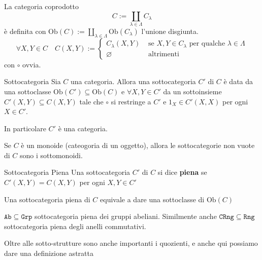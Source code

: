 \begin{example}
    La categoria coprodotto
    \[
      C := \coprod_{\lambda \in \Lambda} C_{\lambda} 
    \]
    è definita con \(\mathrm{Ob}{(C)} := \coprod_{\lambda \in \Lambda} \mathrm{Ob}{(C_{\lambda} )}\) l'unione disgiunta. 
    \[
      \forall X, Y \in C \quad C{(X, Y)} := \begin{cases}{}
          C_{\lambda} {(X, Y)} & \text{ se } X, Y \in C_{\lambda} \text{ per
          qualche } \lambda \in \Lambda \\
              \varnothing & \text{ altrimenti}
      \end{cases}
    \]
    con \(\circ\) ovvia.
\end{example}

\begin{definition}{Sottocategoria}
    Sia \(C\) una categoria. Allora una sottocategoria \(C'\) di \(C\) è data
    da una sottoclasse \(\mathrm{Ob}{(C')} \subseteq \mathrm{Ob}{(C)} \) e \(\forall X, Y \in C'\) da un sottoinsieme \(C'{(X, Y)} \subseteq C{(X, Y)} \) tale che \(\circ\) si restringe a \(C'\) e \(1_X \in C'{(X, X)}\) per ogni \(X \in C'\).

    In particolare \(C'\) è una categoria.
\end{definition}

\begin{example}{}
    Se \(C\) è un monoide (cateogoria di un oggetto), allora le sottocategorie
    non vuote di \(C\) sono i sottomonoidi.
\end{example}

\begin{definition}{Sottocategoria Piena}
    Una sottocategoria \(C'\) di \(C\) si dice \textbf{piena} se \(C'{(X, Y)} =
    C{(X, Y)}\) per ogni \(X, Y \in C'\) 
\end{definition}

\begin{remark}{}
    Una sottocategoria piena di \(C\) equivale a dare una sottoclasse di \(\mathrm{Ob}{(C)}\) 
\end{remark}

\begin{example}
    \(\mathtt{Ab} \subseteq \mathtt{Grp} \) sottocategoria piena dei gruppi
    abeliani. Similmente anche \(\mathtt{CRng} \subseteq \mathtt{Rng} \)
    sottocategoria piena degli anelli commutativi.
\end{example}

Oltre alle sotto-strutture sono anche importanti i quozienti, e anche qui
possiamo dare una definizione astratta

